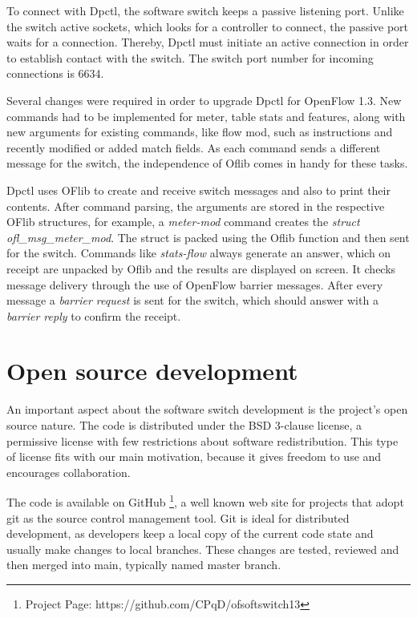 To connect with Dpctl, the software switch keeps a passive listening port. Unlike the switch active sockets, which looks for a controller to connect, the passive port waits for a connection. Thereby, Dpctl must initiate an active connection in order to establish contact with the switch. The switch port number for incoming connections is 6634.

Several changes were required in order to upgrade Dpctl for OpenFlow 1.3. New commands had to be implemented for meter, table stats and features, along with new arguments for existing commands, like flow mod, such as instructions and recently modified or added match fields. As each command sends a different message for the switch, the independence of Oflib comes in handy for these tasks.  

Dpctl uses OFlib to create and receive switch messages and also to print their contents. After command parsing, the arguments are stored in the respective OFlib structures, for example, a \textit{meter-mod} command creates the \textit{struct ofl_msg_meter_mod}. The struct is packed using the Oflib function and then sent for the switch. Commands like \textit{stats-flow} always generate an answer, which on receipt are unpacked by Oflib and the results are displayed on screen. It checks message delivery through the use of OpenFlow barrier messages. After every message a \textit{barrier request }is sent for the switch, which should answer with a \textit{barrier reply} to confirm the receipt.


\section{Open source development}
\label{OpenSourceDev}

An important aspect about the software switch development is the project's open source nature. The code is distributed under the BSD 3-clause license, a permissive license with few restrictions about software redistribution. This type of license fits with our main motivation, because it gives freedom to use and encourages collaboration. 

The code is available on GitHub \footnote{Project Page: https://github.com/CPqD/ofsoftswitch13}, a well known web site for projects that adopt git \cite{GIT} as the source control management tool. Git is ideal for distributed development, as developers keep a local copy of the current code state and usually make changes to local branches. These changes are tested, reviewed and then merged into main, typically named master branch.    

